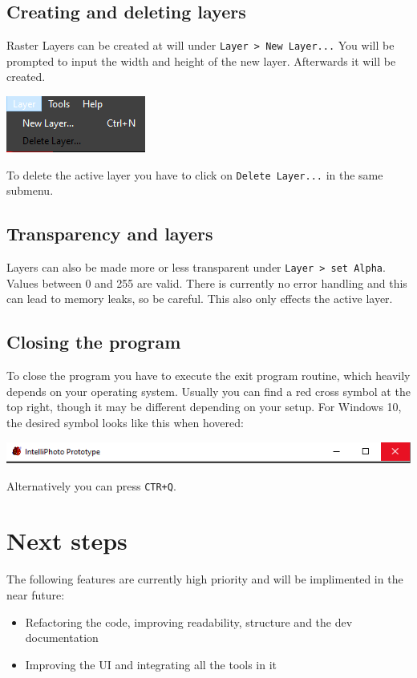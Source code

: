 \documentclass[a4paper, 12pt]{article}
\begin{document}
\subsection{Creating and deleting layers}
Raster Layers can be created at will under \texttt{Layer > New Layer...} You will be prompted to input the width and height of the new layer. Afterwards it will be created.
\begin{center}
\includegraphics[width=0.3\linewidth,keepaspectratio]{assets/create-layer}
\end{center}
To delete the active layer you have to click on \texttt{Delete Layer...} in the same submenu.

\subsection{Transparency and layers}
Layers can also be made more or less transparent under \texttt{Layer > set Alpha}. Values between 0 and 255 are valid. There is currently no error handling and this can lead to memory leaks, so be careful. This also only effects the active layer.

\subsection{Closing the program}
To close the program you have to execute the exit program routine, which heavily depends on your operating system. Usually you can find a red cross symbol at the top right, though it may be different depending on your setup.
For Windows 10, the desired symbol looks like this when hovered:
\begin{center}
\includegraphics[width=0.9\linewidth,keepaspectratio]{assets/close-window}
\end{center}
Alternatively you can press \texttt{CTR+Q}.

\section{Next steps}
The following features are currently high priority and will be implimented in the near future:
\begin{itemize}
\item Refactoring the code, improving readability, structure and the dev documentation
\item Improving the UI and integrating all the tools in it
\end{itemize}
\end{document}
